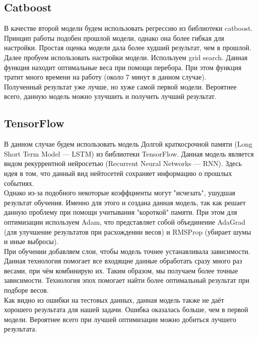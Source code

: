 \documentclass{article}
\begin{document}
\subsection{Catboost}

В качестве второй модели будем использовать регрессию из библиотеки catboost. Принцип работы подобен прошлой модели, однако она более гибкая для настройки. Простая оценка модели дала более худший результат, чем в прошлой.  
\\
 
Далее пробуем использовать настройки модели. Используем grid search. Данная функция находит оптимальные веса при помощи перебора. При этом функция тратит много времени на работу (около 7 минут в данном случае). 
\\
 
Полученный результат уже лучше, но хуже самой первой модели. Вероятнее всего, данную модель можно улучшить и получить лучший результат.  
\\

\subsection{TensorFlow}
В данном случае будем использовать модель Долгой краткосрочной памяти (Long Short Term Model — LSTM) из библиотеки TensorFlow. Данная модель является видом рекуррентной нейросетью (Recurrent Neural Networks — RNN). Здесь идея в том, что данный вид нейтосетей сохраняет информацию о прошлых событиях. 
\\

Однако из-за подобного некоторые коэффциенты могут "исчезать", ушудшая результат обучения. Именно для этого и создана данная модель, так как решает данную проблему при помощи учитывания "короткой" памяти. При этом для оптимизации используем Adam, что представляет собой объединение AdaGrad (для улучшение результатов при расхождении весов) и RMSProp (убирает шумы и иные выбросы). 
\\
 
При обучении добавляем слои, чтобы модель точнее устанавливала зависимости. Данная технология помогает все входящие данные обработать сразу много раз весами, при чём комбинирую их. Таким образом, мы получаем более точные зависимости. Технология эпох помогает найти более оптимальный результат при подборе весов. 
\\
 
Как видно из ошибки на тестовых данных, данная модель также не даёт хорошего результата для нашей задачи. Ошибка оказалась больше, чем в первой модели. Вероятнее всего при лучшей оптимизации можно добиться лучшего результата.  
\\
 
\end{document}
